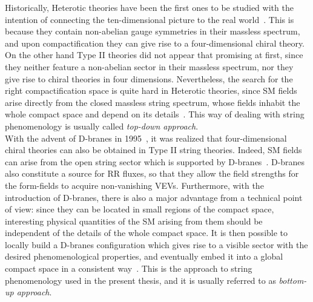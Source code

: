 \documentclass[12pt,a4paper]{book}
\begin{document}
Historically, Heterotic theories have been the first ones to be studied with the intention of connecting the ten-dimensional picture to the real world~\cite{Candelas:1985en, Donagi:2004ia, Greene:1986bm}. This is because they contain non-abelian gauge symmetries in their massless spectrum, and upon compactification they can give rise to a four-dimensional chiral theory. On the other hand Type II theories did not appear that promising at first, since they neither feature a non-abelian sector in their massless spectrum, nor they give rise to chiral theories in four dimensions. Nevertheless, the search for the right compactification space is quite hard in Heterotic theories, since SM fields arise directly from the closed massless string spectrum, whose fields inhabit the whole compact space and depend on its details~\cite{Derendinger:1985kk, Dine:1985rz, Burgess:1995aa, Gukov:2003cy, deWit:1986mwo}. This way of dealing with string phenomenology is usually called \textit{top-down approach}.\\

With the advent of D-branes in 1995~\cite{Polchinski:1995mt}, it was realized that four-dimensional chiral theories can also be obtained in Type II string theories. Indeed, SM fields can arise from the open string sector which is supported by D-branes~\cite{Angelantonj:2002ct}. D-branes also constitute a source for RR fluxes, so that they allow the field strengths for the form-fields to acquire non-vanishing VEVs. Furthermore, with the introduction of D-branes, there is also a major advantage from a technical point of view: since they can be located in small regions of the compact space, interesting physical quantities of the SM arising from them should be independent of the details of the whole compact space. It is then possible to locally build a D-branes configuration which gives rise to a visible sector with the desired phenomenological properties, and eventually embed it into a global compact space in a consistent way~\cite{Blumenhagen:2005mu, Giddings:2001yu, Blumenhagen:2008zz, Verlinde:2005jr, Aldazabal:2000sa}. This is the approach to string phenomenology used in the present thesis, and it is usually referred to as \textit{bottom-up approach}.\\
\end{document}
